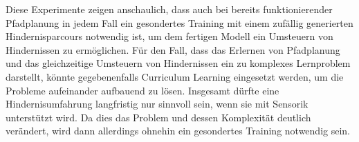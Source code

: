 Diese Experimente zeigen anschaulich, dass auch bei bereits funktionierender Pfadplanung in jedem Fall ein gesondertes Training mit einem zufällig generierten Hindernisparcours notwendig ist, um dem fertigen Modell ein Umsteuern von Hindernissen zu ermöglichen.
Für den Fall, dass das Erlernen von Pfadplanung und das gleichzeitige Umsteuern von Hindernissen ein zu komplexes Lernproblem darstellt, könnte gegebenenfalls Curriculum Learning eingesetzt werden, um die Probleme aufeinander aufbauend zu lösen.
Insgesamt dürfte eine Hindernisumfahrung langfristig nur sinnvoll sein, wenn sie mit Sensorik unterstützt wird.
Da dies das Problem und dessen Komplexität deutlich verändert, wird dann allerdings ohnehin ein gesondertes Training notwendig sein.